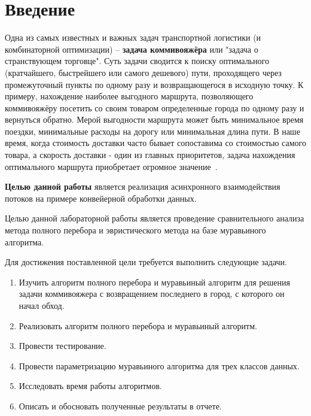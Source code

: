 \documentclass[12pt]{report}
\begin{document}
	
	\newpage
	\tableofcontents
    \chapter*{Введение}
    Одна из самых известных и важных задач транспортной логистики (и комбинаторной оптимизации) – \textbf{задача коммивояжёра} или "задача о странствующем торговце". Суть задачи сводится к поиску оптимального (кратчайшего, быстрейшего или самого дешевого) пути, проходящего через промежуточный пункты по одному разу и возвращающегося в исходную точку. К примеру, нахождение наиболее выгодного маршрута, позволяющего коммивояжёру посетить со своим товаром определенные города по одному разу и вернуться обратно. Мерой выгодности маршрута может быть минимальное время поездки, минимальные расходы на дорогу или минимальная длина пути. В наше время, когда стоимость доставки часто бывает сопоставима со стоимостью самого товара, а скорость доставки - один из главных приоритетов, задача нахождения оптимального маршрута приобретает огромное значение~\cite{1}.
    
    
    \textbf{Целью данной работы} является реализация асинхронного взаимодействия потоков на примере конвейерной обработки данных.
    
    Целью данной лабораторной работы является проведение сравнительного анализа метода полного перебора и эвристического метода на базе муравьиного алгоритма.
    
    Для достижения поставленной цели требуется выполнить следующие задачи.
    \begin{enumerate}
    	\item Изучить алгоритм полного перебора и муравьиный алгоритм для решения задачи коммивояжера с возвращением последнего в город, с которого он начал обход.
    	
    	\item Реализовать алгоритм полного перебора и муравьиный алгоритм.
    	
    	\item Провести тестирование.
    	
    	\item Провести параметризацию муравьиного алгоритма для трех классов данных.
    	
    	\item Исследовать время работы алгоритмов.
    	
    	\item Описать и обосновать полученные результаты в отчете.
    \end{enumerate}
    \newpage
    
\end{document}
